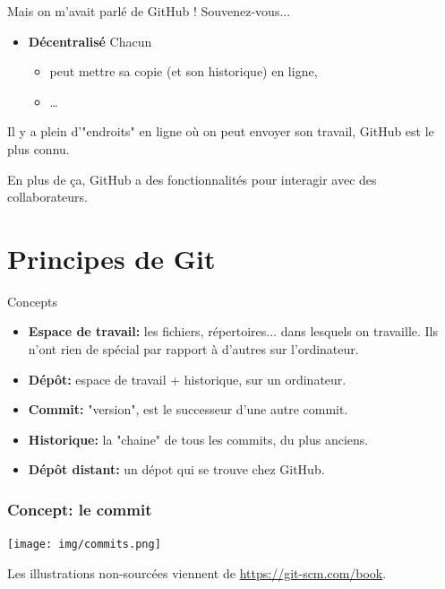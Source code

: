 \documentclass{beamer}
\begin{document}
\begin{frame}{Mais on m'avait parlé de GitHub !}
    Souvenez-vous...
    \begin{itemize}
        \item \textbf{Décentralisé} Chacun
            \begin{itemize}
                \item peut mettre sa copie (et son historique) en ligne,
                \item \dots
            \end{itemize}
    \end{itemize}

    Il y a plein d'"endroits" en ligne o\`u on peut envoyer son travail, GitHub
    est le plus connu.

    En plus de ça, GitHub a des fonctionnalités pour interagir avec des collaborateurs.
\end{frame}

\section{Principes de Git}

\begin{frame}{Concepts}
    \begin{itemize}
        \item \textbf{Espace de travail:}
            les fichiers, répertoires... dans lesquels on
            travaille. Ils n'ont rien de spécial par rapport à d'autres sur
            l'ordinateur.
        \item \textbf{Dépôt:} espace de travail + historique, sur un ordinateur.
        \item \textbf{Commit:} "version", est le successeur d'une autre commit.
        \item \textbf{Historique:} la "chaine" de tous les commits, du plus anciens.
        \item \textbf{Dépôt distant:} un dépot qui se trouve chez GitHub.
    \end{itemize}
\end{frame}

\begin{frame}
\frametitle{Concept: le \textbf{commit}}

\begin{center}
    \texttt{[image: img/commits.png]}
\end{center}
\footnotesize{Les illustrations non-sourcées viennent de \url{https://git-scm.com/book}.}
\end{frame}
\end{document}
